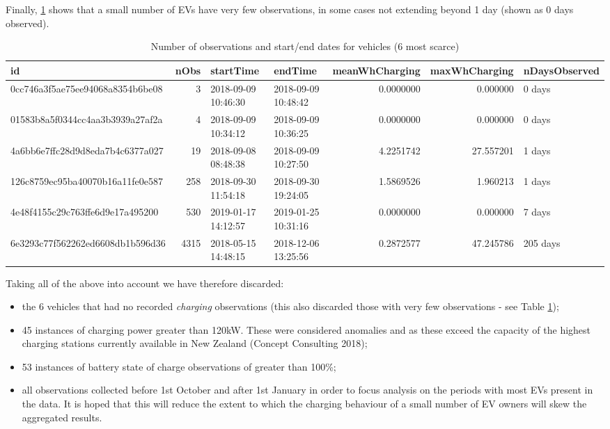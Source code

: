\documentclass[]{article}
\providecommand{\tightlist}{%
  \setlength{\itemsep}{0pt}\setlength{\parskip}{0pt}}
\begin{document}
Finally, \ref{tab:noObsEVs} shows that a small number of EVs have very few observations, in some cases not extending beyond 1 day (shown as 0 days observed).

\begin{table}[t]

\caption{\label{tab:noObsEVs}Number of observations and start/end dates for vehicles (6 most scarce)}
\centering
\begin{tabular}{l|r|l|l|r|r|l}
\hline
id & nObs & startTime & endTime & meanWhCharging & maxWhCharging & nDaysObserved\\
\hline
0cc746a3f5ae75ee94068a8354b6be08 & 3 & 2018-09-09 10:46:30 & 2018-09-09 10:48:42 & 0.0000000 & 0.000000 & 0 days\\
\hline
01583b8a5f0344cc4aa3b3939a27af2a & 4 & 2018-09-09 10:34:12 & 2018-09-09 10:36:25 & 0.0000000 & 0.000000 & 0 days\\
\hline
4a6bb6e7ffc28d9d8eda7b4c6377a027 & 19 & 2018-09-08 08:48:38 & 2018-09-09 10:27:50 & 4.2251742 & 27.557201 & 1 days\\
\hline
126c8759ec95ba40070b16a11fe0e587 & 258 & 2018-09-30 11:54:18 & 2018-09-30 19:24:05 & 1.5869526 & 1.960213 & 1 days\\
\hline
4e48f4155c29c763ffe6d9e17a495200 & 530 & 2019-01-17 14:12:57 & 2019-01-25 10:31:16 & 0.0000000 & 0.000000 & 7 days\\
\hline
6e3293c77f562262ed6608db1b596d36 & 4315 & 2018-05-15 14:48:15 & 2018-12-06 13:25:56 & 0.2872577 & 47.245786 & 205 days\\
\hline
\end{tabular}
\end{table}

Taking all of the above into account we have therefore discarded:

\begin{itemize}
\tightlist
\item
  the 6 vehicles that had no recorded \emph{charging} observations (this also discarded those with very few observations - see Table \ref{tab:noObsEVs});
\item
  45 instances of charging power greater than 120kW. These were considered anomalies and as these exceed the capacity of the highest charging stations currently available in New Zealand (Concept Consulting 2018);
\item
  53 instances of battery state of charge observations of greater than 100\%;
\item
  all observations collected before 1st October and after 1st January in order to focus analysis on the periods with most EVs present in the data. It is hoped that this will reduce the extent to which the charging behaviour of a small number of EV owners will skew the aggregated results.
\end{itemize}
\end{document}
